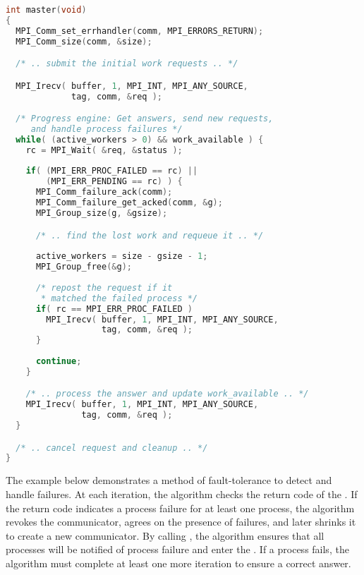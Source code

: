 \begin{lstlisting}[language=C,basicstyle=\ttfamily]
int master(void)
{
  MPI_Comm_set_errhandler(comm, MPI_ERRORS_RETURN);
  MPI_Comm_size(comm, &size);

  /* .. submit the initial work requests .. */

  MPI_Irecv( buffer, 1, MPI_INT, MPI_ANY_SOURCE, 
             tag, comm, &req );

  /* Progress engine: Get answers, send new requests, 
     and handle process failures */
  while( (active_workers > 0) && work_available ) {
    rc = MPI_Wait( &req, &status );
        
    if( (MPI_ERR_PROC_FAILED == rc) || 
        (MPI_ERR_PENDING == rc) ) {
      MPI_Comm_failure_ack(comm);
      MPI_Comm_failure_get_acked(comm, &g);
      MPI_Group_size(g, &gsize);

      /* .. find the lost work and requeue it .. */
            
      active_workers = size - gsize - 1;
      MPI_Group_free(&g);
            
      /* repost the request if it
       * matched the failed process */
      if( rc == MPI_ERR_PROC_FAILED )
        MPI_Irecv( buffer, 1, MPI_INT, MPI_ANY_SOURCE, 
                   tag, comm, &req );
      }
            
      continue;
    }

    /* .. process the answer and update work_available .. */
    MPI_Irecv( buffer, 1, MPI_INT, MPI_ANY_SOURCE, 
               tag, comm, &req );
  }

  /* .. cancel request and cleanup .. */
}
\end{lstlisting}


The example below demonstrates a method of fault-tolerance to detect and handle
failures.  At each iteration, the algorithm checks the return code of the
. If the return code indicates a process failure for at
least one process, the algorithm revokes the
communicator, agrees on the presence of failures, and later shrinks it to create
a new communicator. By calling
, the algorithm
ensures that all processes will be notified of process failure and enter the
. If a process fails, the algorithm must complete
at least one more iteration to ensure a correct answer.

